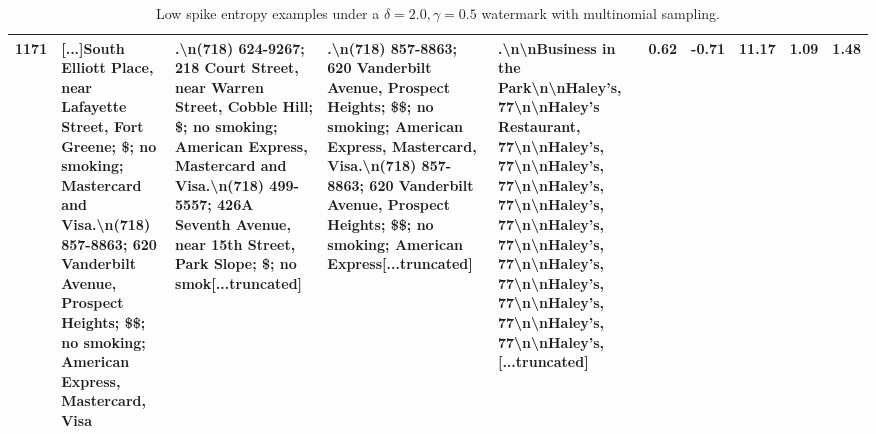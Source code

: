 \documentclass{article}
\theoremstyle{plain}
\theoremstyle{definition}
\theoremstyle{remark}
\begin{document}
\begin{table}[t]
\begin{tabular}{p{0.2cm}|p{2.75cm}|p{2.75cm}|p{2.75cm}|p{2.75cm}|p{0.2cm}|p{0.42cm}|p{0.42cm}|p{0.3cm}|p{0.3cm}}
1171 &  [...]South Elliott Place, near Lafayette Street, Fort Greene; \$; no smoking; Mastercard and Visa.\textbackslash n(718) 857-8863; 620 Vanderbilt Avenue, Prospect Heights; \$\$; no smoking; American Express, Mastercard, Visa & .\textbackslash n(718) 624-9267; 218 Court Street, near Warren Street, Cobble Hill; \$; no smoking; American Express, Mastercard and Visa.\textbackslash n(718) 499-5557; 426A Seventh Avenue, near 15th Street, Park Slope; \$; no smok[...truncated] & .\textbackslash n(718) 857-8863; 620 Vanderbilt Avenue, Prospect Heights; \$\$; no smoking; American Express, Mastercard, Visa.\textbackslash n(718) 857-8863; 620 Vanderbilt Avenue, Prospect Heights; \$\$; no smoking; American Express[...truncated] & .\textbackslash n\textbackslash nBusiness in the Park\textbackslash n\textbackslash nHaley’s, 77\textbackslash n\textbackslash nHaley’s Restaurant, 77\textbackslash n\textbackslash nHaley’s, 77\textbackslash n\textbackslash nHaley’s, 77\textbackslash n\textbackslash nHaley’s, 77\textbackslash n\textbackslash nHaley’s, 77\textbackslash n\textbackslash nHaley’s, 77\textbackslash n\textbackslash nHaley’s, 77\textbackslash n\textbackslash nHaley’s, 77\textbackslash n\textbackslash nHaley’s, 77\textbackslash n\textbackslash nHaley’s, 77\textbackslash n\textbackslash nHaley’s, 77\textbackslash n\textbackslash nHaley’s,[...truncated] &               0.62 &          -0.71 &         11.17 &       1.09 &      1.48 \\
\bottomrule
\end{tabular}
\caption{Low spike entropy examples under a $\delta=2.0,\gamma=0.5$ watermark with multinomial sampling.}\label{tab:low-entropy-examples}
\end{table}
\end{document}
